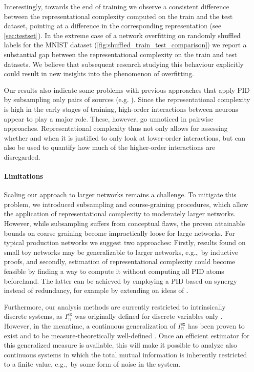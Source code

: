 \documentclass[10pt]{article}
\renewcommand\autoref[1]{\cref{#1}}
\theoremstyle{definition}
\theoremstyle{plain}
\begin{document}
Interestingly, towards the end of training we observe a consistent difference between the representational complexity computed on the train and the test dataset, pointing at a difference in the corresponding representation (see \autoref{sec:testset}). In the extreme case of a network overfitting on randomly shuffled labels for the MNIST dataset (\autoref{fig:shuffled_train_test_comparison}) we report a substantial gap between the representational complexity on the train and test datasets. We believe that subsequent research studying this behaviour explicitly could result in new insights into the phenomenon of overfitting.

Our results also indicate some problems with previous approaches that apply PID by subsampling only pairs of sources  (e.g. \cite{tax_partial_2017}). Since the representational complexity is high in the early stages of training, high-order interactions between neurons appear to play a major role. These, however, go unnoticed in pairwise approaches. Representational complexity thus not only allows for assessing whether and when it is justified to only look at lower-order interactions, but can also be used to quantify how much of the higher-order interactions are disregarded.

\paragraph{Limitations}
\label{sec:limitations}
Scaling our approach to larger networks remains a challenge. To mitigate this problem, we introduced subsampling and course-graining procedures, which allow the application of representational complexity to moderately larger networks. However, while subsampling suffers from conceptual flaws, the proven attainable bounds on coarse graining become impractically loose for large networks. For typical production networks we suggest two approaches: Firstly, results found on small toy networks may be generalizable to larger networks, e.g.,~by inductive proofs, and secondly, estimation of representational complexity could become feasible by finding a way to compute it without computing all PID atoms beforehand. The latter can be achieved by employing a PID based on synergy instead of redundancy, for example by extending on ideas of \citet{rosas_operational_2020}.

Furthermore, our analysis methods are currently restricted to intrinsically discrete systems, as $I^{\mathrm{sx}}_\cap$ was originally defined for discrete variables only \citep{makkeh_introducing_2021}. However, in the meantime, a continuous generalization of $I^{\mathrm{sx}}_\cap$ has been proven to exist and to be measure-theoretically well-defined \citep{schick-poland_partial_2021}. Once an efficient estimator for this generalized measure is available, this will make it possible to analyze also continuous systems in which the total mutual information is inherently restricted to a finite value, e.g.,~by some form of noise in the system.
\end{document}
